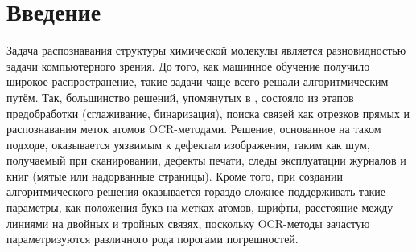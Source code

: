 \chapter*{Введение} %


Задача распознавания структуры химической молекулы является разновидностью задачи компьютерного зрения. До того, как машинное обучение получило широкое распространение, такие задачи чаще всего решали алгоритмическим путём. Так, большинство решений, упомянутых в \cite{rajan2020review}, состояло из этапов предобработки (сглаживание, бинаризация), поиска связей как отрезков прямых и распознавания меток атомов OCR-методами. Решение, основанное на таком подходе, оказывается уязвимым к дефектам изображения, таким как шум, получаемый при сканировании, дефекты печати, следы эксплуатации журналов и книг (мятые или надорванные страницы). Кроме того, при создании алгоритмического решения оказывается гораздо сложнее поддерживать такие параметры, как положения букв на метках атомов,
шрифты, расстояние между линиями на двойных и тройных связях,
поскольку OCR-методы зачастую параметризуются различного рода порогами погрешностей.

